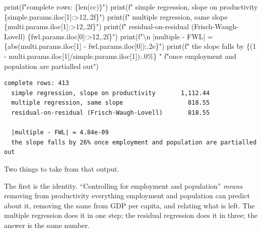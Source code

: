 \documentclass[
  letterpaper,
  10pt,
  twoside,
  openright,
  numbers=noenddot,
  chapterprefix=true]{scrbook}
\newenvironment{Shaded}{}{}
\newcommand{\BuiltInTok}[1]{\textcolor[rgb]{0.84,0.23,0.29}{#1}}
\newcommand{\CharTok}[1]{\textcolor[rgb]{0.01,0.18,0.38}{#1}}
\newcommand{\DecValTok}[1]{\textcolor[rgb]{0.00,0.36,0.77}{#1}}
\newcommand{\NormalTok}[1]{\textcolor[rgb]{0.14,0.16,0.18}{#1}}
\newcommand{\OperatorTok}[1]{\textcolor[rgb]{0.14,0.16,0.18}{#1}}
\newcommand{\SpecialCharTok}[1]{\textcolor[rgb]{0.00,0.36,0.77}{#1}}
\newcommand{\SpecialStringTok}[1]{\textcolor[rgb]{0.01,0.18,0.38}{#1}}
\begin{document}
\begin{Shaded}
\begin{Highlighting}[]
\BuiltInTok{print}\NormalTok{(}\SpecialStringTok{f"complete rows: }\SpecialCharTok{\{}\BuiltInTok{len}\NormalTok{(cc)}\SpecialCharTok{\}}\SpecialStringTok{"}\NormalTok{)}
\BuiltInTok{print}\NormalTok{(}\SpecialStringTok{f"  simple regression, slope on productivity   }\SpecialCharTok{\{}\NormalTok{simple}\SpecialCharTok{.}\NormalTok{params}\SpecialCharTok{.}\NormalTok{iloc[}\DecValTok{1}\NormalTok{]}\SpecialCharTok{:\textgreater{}12,.2f\}}\SpecialStringTok{"}\NormalTok{)}
\BuiltInTok{print}\NormalTok{(}\SpecialStringTok{f"  multiple regression, same slope            }\SpecialCharTok{\{}\NormalTok{multi}\SpecialCharTok{.}\NormalTok{params}\SpecialCharTok{.}\NormalTok{iloc[}\DecValTok{1}\NormalTok{]}\SpecialCharTok{:\textgreater{}12,.2f\}}\SpecialStringTok{"}\NormalTok{)}
\BuiltInTok{print}\NormalTok{(}\SpecialStringTok{f"  residual{-}on{-}residual (Frisch{-}Waugh{-}Lovell) }\SpecialCharTok{\{}\NormalTok{fwl}\SpecialCharTok{.}\NormalTok{params}\SpecialCharTok{.}\NormalTok{iloc[}\DecValTok{0}\NormalTok{]}\SpecialCharTok{:\textgreater{}12,.2f\}}\SpecialStringTok{"}\NormalTok{)}
\BuiltInTok{print}\NormalTok{(}\SpecialStringTok{f"}\CharTok{\textbackslash{}n}\SpecialStringTok{  |multiple {-} FWL| = }\SpecialCharTok{\{}\BuiltInTok{abs}\NormalTok{(multi.params.iloc[}\DecValTok{1}\NormalTok{] }\OperatorTok{{-}}\NormalTok{ fwl.params.iloc[}\DecValTok{0}\NormalTok{])}\SpecialCharTok{:.2e\}}\SpecialStringTok{"}\NormalTok{)}
\BuiltInTok{print}\NormalTok{(}\SpecialStringTok{f"  the slope falls by }\SpecialCharTok{\{}\NormalTok{(}\DecValTok{1} \OperatorTok{{-}}\NormalTok{ multi.params.iloc[}\DecValTok{1}\NormalTok{]}\OperatorTok{/}\NormalTok{simple.params.iloc[}\DecValTok{1}\NormalTok{])}\SpecialCharTok{:.0\%\}}\SpecialStringTok{ "}
      \SpecialStringTok{f"once employment and population are partialled out"}\NormalTok{)}
\end{Highlighting}
\end{Shaded}

\begin{verbatim}
complete rows: 413
  simple regression, slope on productivity       1,112.44
  multiple regression, same slope                  818.55
  residual-on-residual (Frisch-Waugh-Lovell)       818.55

  |multiple - FWL| = 4.84e-09
  the slope falls by 26% once employment and population are partialled out
\end{verbatim}

Two things to take from that output.

The first is the identity. ``Controlling for employment and population''
\emph{means} removing from productivity everything employment and
population can predict about it, removing the same from GDP per capita,
and relating what is left. The multiple regression does it in one step;
the residual regression does it in three; the answer is the same number.
\end{document}
